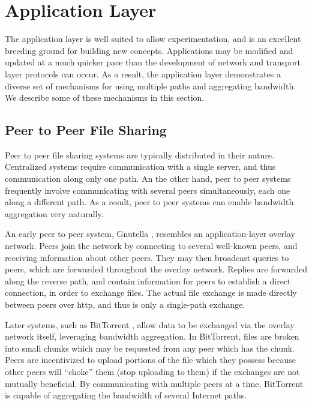 \documentclass{cwru}
\begin{document}
\section{Application Layer}

The application layer is well suited to allow experimentation, and is an
excellent breeding ground for building new concepts. Applications may be
modified and updated at a much quicker pace than the development of network and
transport layer protocols can occur. As a result, the application layer
demonstrates a diverse set of mechanisms for using multiple paths and
aggregating bandwidth. We describe some of these mechanisms in this section.

\subsection{Peer to Peer File Sharing}

Peer to peer file sharing systems are typically distributed in their nature.
Centralized systems require communication with a single server, and thus
communication along only one path. An the other hand, peer to peer systems
frequently involve communicating with several peers simultaneously, each one
along a different path. As a result, peer to peer systems can enable bandwidth
aggregation very naturally.

An early peer to peer system, Gnutella \cite{adar2000free}, resembles an
application-layer overlay network. Peers join the network by connecting to
several well-known peers, and receiving information about other peers. They may
then broadcast queries to peers, which are forwarded throughout the overlay
network. Replies are forwarded along the reverse path, and contain information
for peers to establish a direct connection, in order to exchange files. The
actual file exchange is made directly between peers over \ac{http}, and thus is
only a single-path exchange.

Later systems, such as BitTorrent \cite{cohen2003incentives}, allow data to be
exchanged via the overlay network itself, leveraging bandwidth aggregation. In
BitTorrent, files are broken into small chunks which may be requested from any
peer which has the chunk. Peers are incentivized to upload portions of the file
which they possess because other peers will ``choke'' them (stop uploading to
them) if the exchanges are not mutually beneficial. By communicating with
multiple peers at a time, BitTorrent is capable of aggregating the bandwidth of
several Internet paths.
\end{document}
